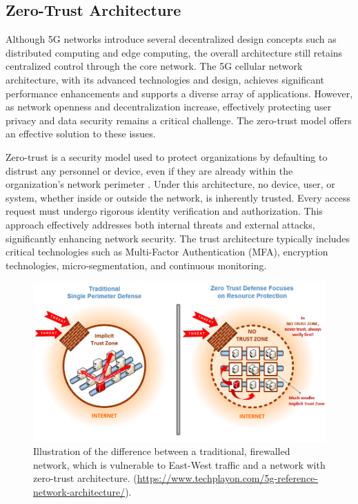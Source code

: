\documentclass[sigplan,screen]{acmart}
\begin{document}
\subsection{Zero-Trust Architecture}
Although 5G networks introduce several decentralized design concepts such as distributed computing and edge computing, the overall architecture still retains centralized control through the core network. The 5G cellular network architecture, with its advanced technologies and design, achieves significant performance enhancements and supports a diverse array of applications. However, as network openness and decentralization increase, effectively protecting user privacy and data security remains a critical challenge. The zero-trust model offers an effective solution to these issues. \cite{ahmadi2024zero}

Zero-trust is a security model used to protect organizations by defaulting to distrust any personnel or device, even if they are already within the organization's network perimeter \cite{ramezanpour2022intelligent}. Under this architecture, no device, user, or system, whether inside or outside the network, is inherently trusted. Every access request must undergo rigorous identity verification and authorization. This approach effectively addresses both internal threats and external attacks, significantly enhancing network security. The trust architecture typically includes critical technologies such as Multi-Factor Authentication (MFA), encryption technologies, micro-segmentation, and continuous monitoring.

\begin{figure}[htbp]
\centering
\includegraphics[width=\linewidth]{zero-trust.png}
\caption{Illustration of the difference between a traditional, firewalled network, which is vulnerable to East-West traffic and a network with zero-trust architecture.  (\url{https://www.techplayon.com/5g-reference-network-architecture/}).}
\end{figure}
\end{document}
